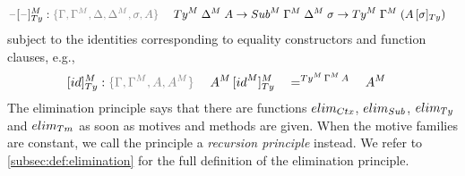 \documentclass[a4paper,UKenglish,numberwithinsect,cleveref,thm-restate]{lipics-v2021}
\begin{document}
\begin{alignat*}{3}
  \blank[\blank]_{\Ty}^M & : \implicit{\Gamma, \Gamma^M,\Delta, \Delta^M, \sigma, A} \; && \Ty^M\;\Delta^M\;A \to \Sub^M\;\Gamma^M\;\Delta^M\;\sigma \to \Ty^M\;\Gamma^M\;(\subTy{A}{\sigma}) %
\end{alignat*}
subject to the identities corresponding to equality constructors and function clauses, e.g.,
\begin{alignat*}{5}
  [\idS]_{\Ty}^M & : \implicit{\Gamma, \Gamma^M, A, A^M}\; && \subTyM{A^M}{\idS^M} && =^{\Ty^M\,\Gamma^M\,A}\;&& A^M %
\end{alignat*}
%
The elimination principle says that there are functions $\elim_{\Ctx}$, $\elim_{\Sub}$, $\elim_{\Ty}$ and $\elim_{\Tm}$ as soon as motives and methods are given.
When the motive families are constant, we call the principle a \emph{recursion principle} instead.
We refer to \cref{subsec:def:elimination} for the full definition of the elimination principle.
%
%
\end{document}
